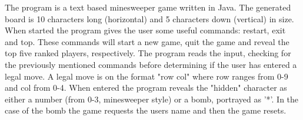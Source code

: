 The program is a text based minesweeper game written in Java. The generated board is 10 characters long (horizontal) and 5 characters down (vertical) in size. When started the program gives the user some useful commands: restart, exit and top. These commands will start a new game, quit the game and reveal the top five ranked players, respectively. The program reads the input, checking for the previously mentioned commands before determining if the user has entered a legal move. A legal move is on the format "row col" where row ranges from 0-9 and col from 0-4. When entered the program reveals the "hidden" character as either a number (from 0-3, minesweeper style) or a bomb, portrayed as '*'. In the case of the bomb the game requests the users name and then the game resets.








